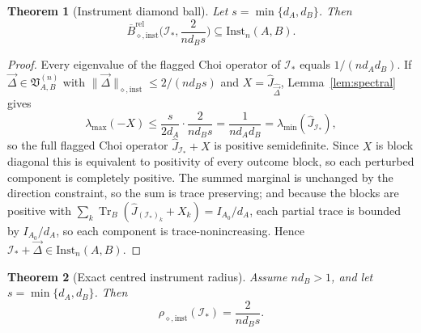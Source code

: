 \documentclass[11pt,a4paper]{article}
\newtheorem{theorem}{Theorem}[section]
\newcommand{\Inst}{\mathrm{Inst}}
\newcommand{\Tr}{\operatorname{Tr}}
\newcommand{\Jhat}{\widehat J}
\newcommand{\vD}{\vec{\Delta}}
\begin{document}
\begin{theorem}[Instrument diamond ball]
\label{thm:ball}
Let $s=\min\{d_A,d_B\}$. Then
\[
\overline B_{\diamond,\mathrm{inst}}^{\mathrm{rel}}\Big(\mathcal I_*,\frac{2}{nd_Bs}\Big)
\subseteq\Inst_n(A,B).
\]
\end{theorem}

\begin{proof}
Every eigenvalue of the flagged Choi operator of $\mathcal I_*$ equals $1/(nd_Ad_B)$. If $\vD\in\mathfrak V_{A,B}^{(n)}$ with $\|\vD\|_{\diamond,\mathrm{inst}}\le2/(nd_Bs)$ and $X=\Jhat_{\widehat{\vD}}$, Lemma~\ref{lem:spectral} gives
\[
\lambda_{\max}(-X)\le\frac{s}{2d_A}\cdot\frac{2}{nd_Bs}=\frac1{nd_Ad_B}=\lambda_{\min}(\Jhat_{\mathcal I_*}),
\]
so the full flagged Choi operator $\Jhat_{\mathcal I_*}+X$ is positive semidefinite. Since $X$ is block diagonal this is equivalent to positivity of every outcome block, so each perturbed component is completely positive. The summed marginal is unchanged by the direction constraint, so the sum is trace preserving; and because the blocks are positive with $\sum_k\Tr_B(\Jhat_{(\mathcal I_*)_k}+X_k)=I_{A_0}/d_A$, each partial trace is bounded by $I_{A_0}/d_A$, so each component is trace-nonincreasing. Hence $\mathcal I_*+\vD\in\Inst_n(A,B)$.
\end{proof}

\begin{theorem}[Exact centred instrument radius]
\label{thm:exact-radius}
Assume $nd_B>1$, and let $s=\min\{d_A,d_B\}$. Then
\[
\rho_{\diamond,\mathrm{inst}}(\mathcal I_*)=\frac{2}{nd_Bs}.
\]
\end{theorem}
\end{document}
